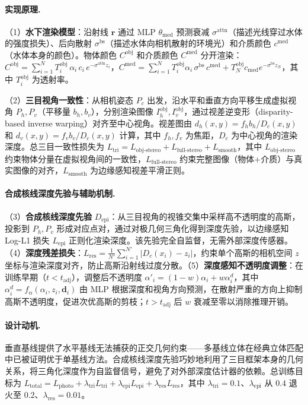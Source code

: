 \paragraph{实现原理.}（1）\textbf{水下渲染模型}：沿射线 $\mathbf{r}$ 通过 MLP $\theta_\text{med}$ 预测衰减 $\sigma^\text{attn}$（描述光线穿过水体的强度损失）、后向散射 $\sigma^\text{bs}$（描述水体向相机散射的环境光）和介质颜色 $c^\text{med}$（水体本身的颜色）。物体颜色 $C^\text{obj}$ 和介质颜色 $C^\text{med}$ 分开渲染：$C^\text{obj} = \sum_{i=1}^N T_i^\text{obj}\,\alpha_i\,c_i\,e^{-\sigma^\text{attn}z_i}$，$C^\text{med} = \sum_{i=1}^N T_i^\text{obj}\alpha_i\,\sigma^\text{bs}\,c^\text{med} + T_N^\text{obj}c_\text{med}e^{-\sigma^\text{bs}z_N}$，其中 $T_i^\text{obj}$ 为透射率。

（2）\textbf{三目视角一致性}：从相机姿态 $P_c$ 出发，沿水平和垂直方向平移生成虚拟视角 $P_h, P_v$（平移量 $b_h, b_v$），分别渲染图像 $I_h^\text{obj}, I_v^\text{obj}$，通过视差逆变形（disparity-based inverse warping）对齐至中心视角。视差图由 $d_h(x,y) = f_h b_h / D_c(x,y)$ 和 $d_v(x,y) = f_v b_v / D_c(x,y)$ 计算，其中 $f_h, f_v$ 为焦距，$D_c$ 为中心视角的渲染深度。总三目一致性损失为 $L_\text{tri} = L_\text{obj-stereo} + L_\text{full-stereo} + L_\text{smooth}$，其中 $L_\text{obj-stereo}$ 约束物体分量在虚拟视角间的一致性，$L_\text{full-stereo}$ 约束完整图像（物体+介质）与真实图像的对齐，$L_\text{smooth}$ 为边缘感知视差平滑正则。

\paragraph{合成核线深度先验与辅助机制.}（3）\textbf{合成核线深度先验} $D_\text{epi}$：从三目视角的视锥交集中采样高不透明度的高斯，投影到 $P_h, P_v$ 形成对应点对，通过对极几何三角化得到深度先验，以边缘感知 Log-L1 损失 $L_\text{epi}$ 正则化渲染深度。该先验完全自监督，无需外部深度传感器。（4）\textbf{深度残差损失}：$L_\text{res} = \frac{1}{N'}\sum_{i=1}^{N'}|D_c(x_i) - z_i|$，约束单个高斯的相机空间 $z$ 坐标与渲染深度对齐，防止高斯沿射线过度分散。（5）\textbf{深度感知不透明度调整}：在训练早期（$t < t_\text{adj}$），调整后不透明度 $\alpha'_i = (1{-}w)\alpha_i + w\alpha_i^d$，其中 $\alpha_i^d = f_\alpha(\alpha_i, z_i, \mathbf{d}_i)$ 由 MLP 根据深度和视角方向预测，在散射严重的方向上抑制高斯不透明度，促进次优高斯的剪枝；$t > t_\text{adj}$ 后 $w$ 衰减至零以消除推理开销。

\paragraph{设计动机.}垂直基线提供了水平基线无法捕获的正交几何约束——多基线立体在经典立体匹配中已被证明优于单基线方法。合成核线深度先验巧妙地利用了三目框架本身的几何关系，将三角化深度作为自监督信号，避免了对外部深度估计器的依赖。总训练目标为 $L_\text{total} = L_\text{photo} + \lambda_\text{tri}L_\text{tri} + \lambda_\text{epi}L_\text{epi} + \lambda_\text{res}L_\text{res}$，其中 $\lambda_\text{tri}{=}0.1$、$\lambda_\text{epi}$ 从 $0.4$ 退火至 $0.2$、$\lambda_\text{res}{=}0.01$。

